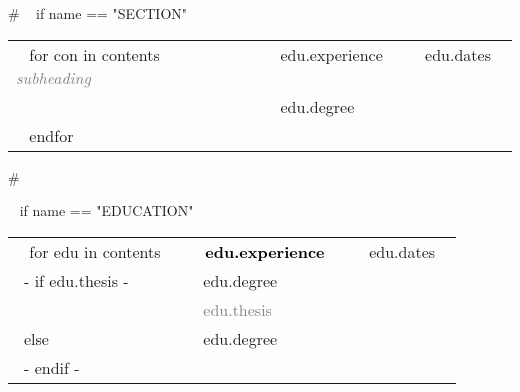 

\medskip

\selectfont


\begin{minipage}{\textwidth}

{# 
~{ if name == "SECTION" }~

\begin{tabular}{ p{} %
                   p{} 
                   p{}} %
  ~{ for con in contents }~
  \small\textcolor{gray}{{\emph{ subheading }}} & {~{{ edu.experience }}~} & {\hfill \small{~{{ edu.dates }}~}}\\
  \small & {~{{ edu.degree }}~} & {\hfill} \newline\\
  ~{ endfor }~
\end{tabular}
#}



~{ if name == "EDUCATION" }~

  \begin{tabular}{ p{} 
                   p{} 
                   p{}}
  ~{ for edu in contents }~
  \small\textcolor{gray}{{\emph{  }}} & \textbf{\textcolor{black}{~{{ edu.experience }}~}} & {\hfill \small{~{{ edu.dates }}~}}\\
  ~{- if edu.thesis -}~ 
  \small & {~{{ edu.degree }}~} & {\hfill} \\
   & \textcolor{gray}{~{{ edu.thesis }}~} & {\hfill} \newline \\
  ~{else}~
   \small & {~{{ edu.degree }}~} & {\hfill} \newline\\
  ~{- endif -}~


\end{tabular}
\end{minipage}
